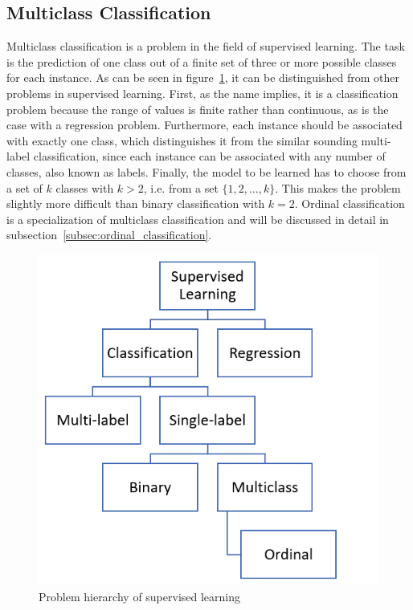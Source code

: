 \documentclass[article,type=msc,colorback,accentcolor=tud7b]{tudthesis}
\begin{document}
  \subsection{Multiclass Classification}
  \label{subsec:multiclass_classification}  
    Multiclass classification is a problem in the field of supervised learning. The task is the prediction of one class out of a finite set of three or more possible classes for each instance. As can be seen in figure~\ref{fig:problem_hierarchy_supervised_learning}, it can be distinguished from other problems in supervised learning. First, as the name implies, it is a classification problem because the range of values is finite rather than continuous, as is the case with a regression problem. Furthermore, each instance should be associated with exactly one class, which distinguishes it from the similar sounding multi-label classification, since each instance can be associated with any number of classes, also known as labels. Finally, the model to be learned has to choose from a set of $k$ classes with $k>2$, i.e. from a set $\{1,2,\dots,k\}$. This makes the problem slightly more difficult than binary classification with $k=2$. Ordinal classification is a specialization of multiclass classification and will be discussed in detail in subsection~\ref{subsec:ordinal_classification}.
    
    \begin{figure}[H]
      \centering
      \includegraphics{images/problem_hierarchy_supervised_learning}
      \caption{Problem hierarchy of supervised learning}
      \label{fig:problem_hierarchy_supervised_learning}
    \end{figure}
    
\end{document}
